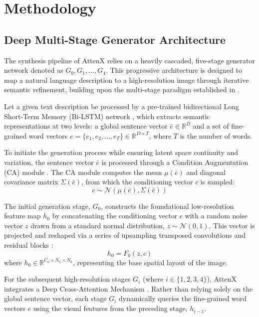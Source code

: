 \documentclass[conference]{IEEEtran}
\begin{document}
\section{Methodology}

\subsection{Deep Multi-Stage Generator Architecture}

The synthesis pipeline of AttenX relies on a heavily cascaded, five-stage generator network denoted as $G_0, G_1, \dots, G_4$. This progressive architecture is designed to map a natural language description to a high-resolution image through iterative semantic refinement, building upon the multi-stage paradigm established in \cite{zhang2018stackgan, xu2018attngan}.

Let a given text description be processed by a pre-trained bidirectional Long Short-Term Memory (Bi-LSTM) network \cite{schuster1997bidirectional, hochreiter1997lstm}, which extracts semantic representations at two levels: a global sentence vector $\bar{e} \in \mathbb{R}^{D}$ and a set of fine-grained word vectors $e = \{e_1, e_2, \dots, e_T\} \in \mathbb{R}^{D \times T}$, where $T$ is the number of words.

To initiate the generation process while ensuring latent space continuity and variation, the sentence vector $\bar{e}$ is processed through a Condition Augmentation (CA) module \cite{zhang2018stackgan}. The CA module computes the mean $\mu(\bar{e})$ and diagonal covariance matrix $\Sigma(\bar{e})$, from which the conditioning vector $c$ is sampled:
\begin{equation}
    c \sim \mathcal{N}(\mu(\bar{e}), \Sigma(\bar{e}))
\end{equation}

The initial generation stage, $G_0$, constructs the foundational low-resolution feature map $h_0$ by concatenating the conditioning vector $c$ with a random noise vector $z$ drawn from a standard normal distribution, $z \sim \mathcal{N}(0, 1)$. This vector is projected and reshaped via a series of upsampling transposed convolutions and residual blocks \cite{he2016deep}:
\begin{equation}
    h_0 = F_0(z, c)
\end{equation}
where $h_0 \in \mathbb{R}^{C_0 \times N_0 \times N_0}$, representing the base spatial layout of the image.

For the subsequent high-resolution stages $G_i$ (where $i \in \{1, 2, 3, 4\}$), AttenX integrates a Deep Cross-Attention Mechanism \cite{xu2018attngan, vaswani2017attention}. Rather than relying solely on the global sentence vector, each stage $G_i$ dynamically queries the fine-grained word vectors $e$ using the visual features from the preceding stage, $h_{i-1}$.
\end{document}
